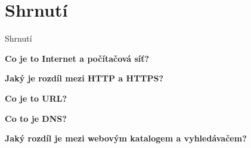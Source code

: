 \documentclass[aspectratio=169]{beamer}
\begin{document}
\section{Shrnutí}
\begin{frame}{Shrnutí}
    \begin{cardTiny}
        \begin{center}
            \textbf{Co je to Internet a počítačová síť?}
        \end{center}
    \end{cardTiny}

    \begin{cardTiny}
        \begin{center}
        \textbf{Jaký je rozdíl mezi HTTP a HTTPS?}
        \end{center}
    \end{cardTiny}

    \begin{cardTiny}
        \begin{center}
        \textbf{Co je to URL?}
        \end{center}
    \end{cardTiny}

    \begin{cardTiny}
        \begin{center}
        \textbf{Co to je DNS?}
        \end{center}
    \end{cardTiny}

    \begin{cardTiny}
        \begin{center}
        \textbf{Jaký rozdíl je mezi webovým katalogem a vyhledávačem?}
        \end{center}
    \end{cardTiny}
\end{frame}
\end{document}
